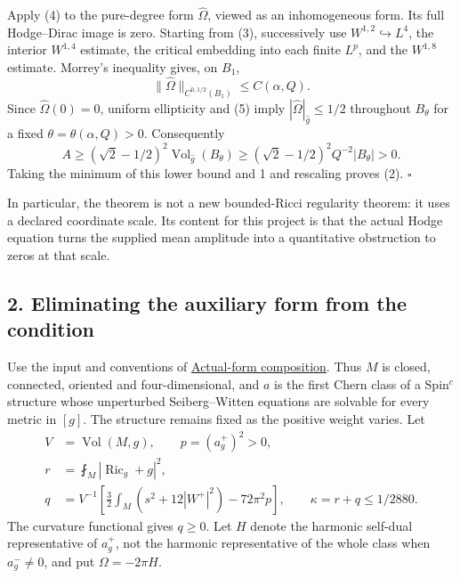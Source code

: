 \documentclass[
  11pt,
]{article}
\begin{document}
Apply (4) to the pure-degree form \(\widehat\Omega\), viewed as an
inhomogeneous form. Its full Hodge--Dirac image is zero. Starting from
(3), successively use \(W^{1,2}\hookrightarrow L^4\), the interior
\(W^{1,4}\) estimate, the critical embedding into each finite \(L^p\),
and the \(W^{1,8}\) estimate. Morrey's inequality gives, on \(B_1\), \[
       \|\widehat\Omega\|_{C^{0,1/2}(B_1)}\le C(\alpha,Q).
                                                               \tag{5}
\] Since \(\widehat\Omega(0)=0\), uniform ellipticity and (5) imply
\(|\widehat\Omega|_{\widehat g}\le1/2\) throughout \(B_\theta\) for a
fixed \(\theta=\theta(\alpha,Q)>0\). Consequently \[
 A\ge(\sqrt2-1/2)^2\operatorname{Vol}_{\widehat g}(B_\theta)
   \ge(\sqrt2-1/2)^2Q^{-2}|B_\theta|>0.
\] Taking the minimum of this lower bound and 1 and rescaling proves
(2). \(\square\)

In particular, the theorem is not a new bounded-Ricci regularity
theorem: it uses a declared coordinate scale. Its content for this
project is that the actual Hodge equation turns the supplied mean
amplitude into a quantitative obstruction to zeros at that scale.

\hypertarget{eliminating-the-auxiliary-form-from-the-condition}{%
\subsection{2. Eliminating the auxiliary form from the
condition}\label{eliminating-the-auxiliary-form-from-the-condition}}

Use the input and conventions of
\href{../mathematics/current/line1_composed_application.md}{Actual-form
composition}. Thus \(M\) is closed, connected, oriented and
four-dimensional, and \(a\) is the first Chern class of a Spin\(^c\)
structure whose unperturbed Seiberg--Witten equations are solvable for
every metric in \([g]\). The structure remains fixed as the positive
weight varies. Let \[
 \begin{split}
 V&=\operatorname{Vol}(M,g),\qquad p=(a_g^+)^2>0,\\
 r&=\fint_M|\operatorname{Ric}_g+g|^2,\\
 q&=V^{-1}\left[\frac32\int_M(s^2+12|W^+|^2)
                                      -72\pi^2p\right],
 \qquad \kappa=r+q\le1/2880.
 \end{split}                                             \tag{6}
\] The curvature functional gives \(q\ge0\). Let \(H\) denote the
harmonic self-dual representative of \(a_g^+\), not the harmonic
representative of the whole class when \(a_g^-\ne0\), and put
\(\Omega=-2\pi H\).
\end{document}
